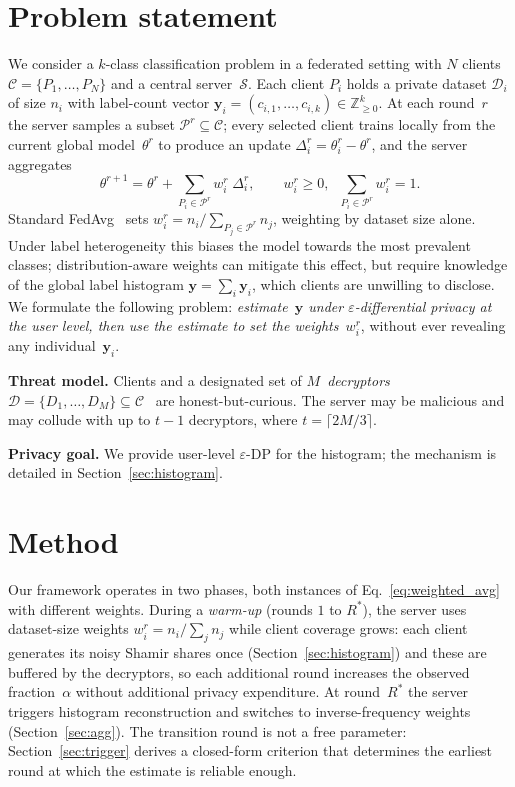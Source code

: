 \documentclass[runningheads]{llncs}
\begin{document}
\section{Problem statement}

We consider a $k$-class classification problem in a federated setting with $N$ clients $\mathcal{C}=\{P_1,\dots,P_N\}$ and a central server~$\mathcal{S}$.
Each client $P_i$ holds a private dataset $\mathcal{D}_i$ of size $n_i$ with label-count vector $\mathbf{y}_i=(c_{i,1},\dots,c_{i,k})\in\mathbb{Z}_{\ge0}^k$.
At each round~$r$ the server samples a subset $\mathcal{P}^r\!\subseteq\mathcal{C}$; every selected client trains locally from the current global model~$\theta^r$ to produce an update $\Delta_i^r=\theta_i^r-\theta^r$, and the server aggregates
\begin{equation}\label{eq:weighted_avg}
    \theta^{r+1} = \theta^{r} + \sum_{P_i\in\mathcal{P}^r} w_i^r\;\Delta_i^{r},
    \qquad
    w_i^r \ge 0,\;\;
    \textstyle\sum_{P_i\in\mathcal{P}^r} w_i^r = 1.
\end{equation}
Standard FedAvg~\cite{ref_mcmahan2017} sets $w_i^r = n_i / \sum_{P_j\in\mathcal{P}^r} n_j$, weighting by dataset size alone.
Under label heterogeneity this biases the model towards the most prevalent classes; distribution-aware weights can mitigate this effect, but require knowledge of the global label histogram $\mathbf{y}=\sum_i\mathbf{y}_i$, which clients are unwilling to disclose.
We formulate the following problem: \emph{estimate~$\mathbf{y}$ under $\varepsilon$-differential privacy at the user level, then use the estimate to set the weights~$w_i^r$}, without ever revealing any individual~$\mathbf{y}_i$.

\textbf{Threat model.}
Clients and a designated set of $M$~\emph{decryptors} $\mathcal{D}=\{D_1,\dots,D_M\}\subseteq\mathcal{C}$~\cite{ref_flamingo} are honest-but-curious.
The server may be malicious and may collude with up to $t-1$ decryptors, where $t=\lceil 2M/3\rceil$.

\textbf{Privacy goal.}
We provide user-level $\varepsilon$-DP for the histogram; the mechanism is detailed in Section~\ref{sec:histogram}.

\section{Method}

Our framework operates in two phases, both instances of Eq.~\eqref{eq:weighted_avg} with different weights.
During a \emph{warm-up} (rounds $1$ to $R^*$), the server uses dataset-size weights $w_i^r\!=\!n_i/\sum_j n_j$ while client coverage grows: each client generates its noisy Shamir shares once (Section~\ref{sec:histogram}) and these are buffered by the decryptors, so each additional round increases the observed fraction~$\alpha$ without additional privacy expenditure.
At round~$R^*$ the server triggers histogram reconstruction and switches to inverse-frequency weights (Section~\ref{sec:agg}).
The transition round is not a free parameter: Section~\ref{sec:trigger} derives a closed-form criterion that determines the earliest round at which the estimate is reliable enough.
\end{document}
